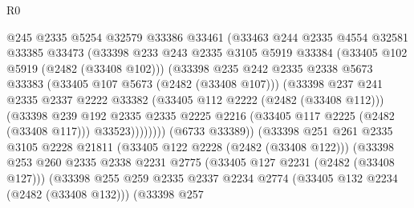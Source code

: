 \begin{lexlean}{R0}
\begin{coremodule}
                        @245
                        @2335
                        @5254
                        @32579
                        @33386
                        @33461
                        (@33463
                          @244
                          @2335
                          @4554
                          @32581
                          @33385
                          @33473
                          (@33398
                            @233
                            @243
                            @2335
                            @3105
                            @5919
                            @33384
                            (@33405 @102 @5919 (@2482 (@33408 @102)))
                            (@33398
                              @235
                              @242
                              @2335
                              @2338
                              @5673
                              @33383
                              (@33405 @107 @5673 (@2482 (@33408 @107)))
                              (@33398
                                @237
                                @241
                                @2335
                                @2337
                                @2222
                                @33382
                                (@33405 @112 @2222 (@2482 (@33408 @112)))
                                (@33398
                                  @239
                                  @192
                                  @2335
                                  @2335
                                  @2225
                                  @2216
                                  (@33405 @117 @2225 (@2482 (@33408 @117)))
                                  @33523))))))))
                  (@6733 @33389))
                (@33398
                  @251
                  @261
                  @2335
                  @3105
                  @2228
                  @21811
                  (@33405 @122 @2228 (@2482 (@33408 @122)))
                  (@33398
                    @253
                    @260
                    @2335
                    @2338
                    @2231
                    @2775
                    (@33405 @127 @2231 (@2482 (@33408 @127)))
                    (@33398
                      @255
                      @259
                      @2335
                      @2337
                      @2234
                      @2774
                      (@33405 @132 @2234 (@2482 (@33408 @132)))
                      (@33398
                        @257

\end{coremodule}
\end{lexlean}
